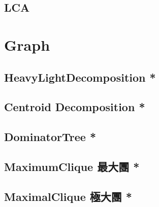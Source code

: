 \documentclass[a4paper,10pt,twocolumn,oneside]{article}
\begin{document}
\subsection{LCA}


\section{Graph}

\subsection{HeavyLightDecomposition *}


\subsection{Centroid Decomposition *}


\subsection{DominatorTree *}


\subsection{MaximumClique 最大團 *}

% 

\subsection{MaximalClique 極大團 *}

% 

%

% 

% 
\end{document}

